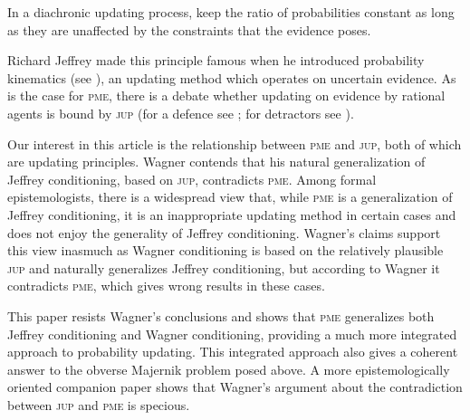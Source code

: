 \documentclass[11pt]{article}
\begin{document}
\begin{quotex}
   In a diachronic updating process, keep the ratio of
  probabilities constant as long as they are unaffected by the
  constraints that the evidence poses.
\end{quotex}

Richard Jeffrey made this principle famous when he introduced
probability kinematics (see ), an updating
method which operates on uncertain evidence. As is the case for
\textsc{pme}, there is a debate whether updating on evidence by
rational agents is bound by \textsc{jup} (for a defence see
; for detractors see
). 

Our interest in this article is the relationship between \textsc{pme}
and \textsc{jup}, both of which are updating principles. Wagner
contends that his natural generalization of Jeffrey conditioning,
based on \textsc{jup}, contradicts \textsc{pme}. Among formal
epistemologists, there is a widespread view that, while \textsc{pme}
is a generalization of Jeffrey conditioning, it is an inappropriate
updating method in certain cases and does not enjoy the generality of
Jeffrey conditioning. Wagner's claims support this view inasmuch as
Wagner conditioning is based on the relatively plausible \textsc{jup}
and naturally generalizes Jeffrey conditioning, but according to
Wagner it contradicts \textsc{pme}, which gives wrong results in these
cases.


This paper resists Wagner's conclusions and shows that \textsc{pme}
generalizes both Jeffrey conditioning and Wagner conditioning,
providing a much more integrated approach to probability updating.
This integrated approach also gives a coherent answer to the obverse
Majernik problem posed above. A more epistemologically oriented
companion paper shows that Wagner's argument about the contradiction
between \textsc{jup} and \textsc{pme} is specious.
\end{document}
